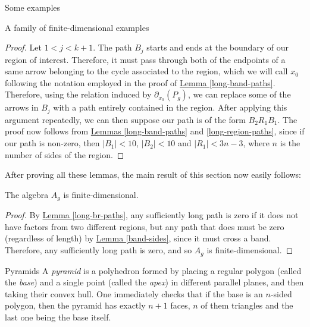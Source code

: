 \begin{chapter}{Some examples}
\begin{section}{A family of finite-dimensional examples}
\begin{proof}
Let $1<j<k+1$. The path $B_j$ starts and ends at the boundary of our region of interest. Therefore, it must pass through both of the endpoints of a same arrow belonging to the cycle associated to the region, which we will call $x_0$ following the notation employed in the proof of \hyperref[long-band-paths]{Lemma \ref*{long-band-paths}}. Therefore, using the relation induced by $\partial_{x_0}(P_g)$, we can replace some of the arrows in $B_j$ with a path entirely contained in the region.
After applying this argument repeatedly, we can then suppose our path is of the form $B_2 R_1 B_1$. The proof now follows from \hyperref[long-band-paths]{Lemmas \ref*{long-band-paths}} and \ref{long-region-paths}, since if our path is non-zero, then $|B_1|<10$, $|B_2|<10$ and $|R_1|<3n-3$, where $n$ is the number of sides of the region.
\end{proof}

After proving all these lemmas, the main result of this section now easily follows:

\begin{thm} The algebra $A_g$ is finite-dimensional.
\end{thm}
\begin{proof} By \hyperref[long-br-paths]{Lemma \ref*{long-br-paths}}, any sufficiently long path is zero if it does not have factors from two different regions, but any path that does must be zero (regardless of length) by \hyperref[band-sides]{Lemma \ref*{band-sides}}, since it must cross a band. Therefore, any sufficiently long path is zero, and so $A_g$ is finite-dimensional.
\end{proof}
\end{section}

\begin{section}{Pyramids}
\label{pyramids}
A \emph{pyramid} is a polyhedron formed by placing a regular polygon (called the \emph{base}) and a single point (called the \emph{apex}) in different parallel planes, and then taking their convex hull. One immediately checks that if the base is an $n$-sided polygon, then the pyramid has exactly $n+1$ faces, $n$ of them triangles and the last one being the base itself.


\end{section}
\end{chapter}
